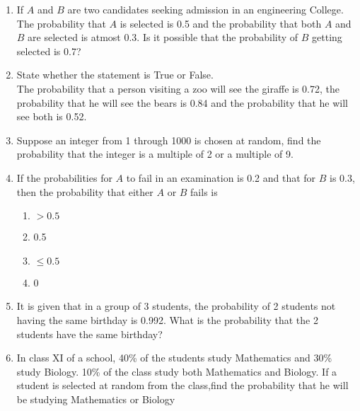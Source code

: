 \begin{enumerate}[label=\thesubsection.\arabic*,ref=\thesubsection.\theenumi,resume*]
\item If $A$ and $B$ are two candidates seeking admission in an engineering College. The probability that $A$ is selected is 0.5 and the probability that both $A$ and $B$ are selected is atmost 0.3. Is it possible that the probability of $B$ getting selected is 0.7?\\
\solution 

\item State whether the statement is True or False.\\
The probability that a person visiting a zoo will see the giraffe is 0.72, the probability that he will see the bears is 0.84 and the probability that he will see both is 0.52.\\
\solution

%
\item Suppose an integer from 1 through 1000 is chosen at random, find the probability that the integer is a multiple of 2 or a multiple of 9.
\\
\solution

\item If the probabilities for $A$ to fail in an examination is 0.2 and that for $B$ is 0.3, then
the probability that either $A$ or $B$ fails is
		\vspace{-3mm}
\begin{multicols}{4}
\begin{enumerate}
\item $>0.5$
\item 0.5
\item $\le 0.5$
\item 0
\end{enumerate}
\end{multicols}
		\vspace{-3mm}
\solution

\item It is given that in a group of 3 students, the probability of 2 students not having the same birthday is 0.992. What is the probability that the 2 students have the same birthday?
	\\
\solution

%
\item  In class XI of a school, 40\% of the students study Mathematics and 30\% study Biology. 10\% of the class study both Mathematics and Biology. If a student is selected at random from the class,find the probability that he will be studying Mathematics or Biology

\end{enumerate}
